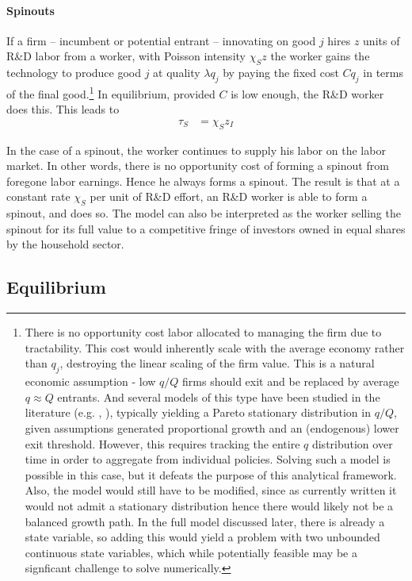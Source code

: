 \documentclass[11pt,english]{article}
\theoremstyle{remark}
\begin{document}
\paragraph{Spinouts} If a firm -- incumbent or potential entrant -- innovating on good $j$ hires $z$ units of R\&D labor from a worker, with Poisson intensity $\chi_S z$ the worker gains the technology to produce good $j$ at quality $\lambda q_j$ by paying the fixed cost $C q_j$ in terms of the final good.\footnote{There is no opportunity cost labor allocated to managing the firm due to tractability. This cost would inherently scale with the average economy rather than $q_j$, destroying the linear scaling of the firm value. This is a natural economic assumption - low $q/Q$ firms should exit and be replaced by average $q \approx Q$ entrants. And several models of this type have been studied in the literature (e.g. \cite{acemoglu_innovation_2015}, ), typically yielding a Pareto stationary distribution in $q/Q$, given assumptions generated proportional growth and an (endogenous) lower exit threshold. However, this requires tracking the entire $q$ distribution over time in order to aggregate from individual policies. Solving such a model is possible in this case, but it defeats the purpose of this analytical framework. Also, the model would still have to be modified, since as currently written it would not admit a stationary distribution hence there would likely not be a balanced growth path. In the full model discussed later, there is already a state variable, so adding this would yield a problem with two unbounded continuous state variables, which while potentially feasible may be a signficant challenge to solve numerically.} In equilibrium, provided $C$ is low enough, the R\&D worker does this. This leads to
\begin{align}
	\tau_S &= \chi_S z_I \label{simplified_spinout_innovation_rate}
\end{align}

In the case of a spinout, the worker continues to supply his labor on the labor market. In other words, there is no opportunity cost of forming a spinout from foregone labor earnings. Hence he always forms a spinout. The result is that at a constant rate $\chi_S$ per unit of R\&D effort, an R\&D worker is able to form a spinout, and does so. The model can also be interpreted as the worker selling the spinout for its full value to a competitive fringe of investors owned in equal shares by the household sector. 

\subsection{Equilibrium}
\end{document}
